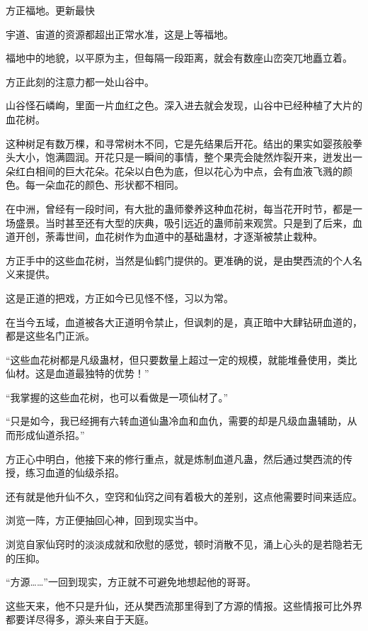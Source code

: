 
\begin{this_body}



方正福地。更新最快

宇道、宙道的资源都超出正常水准，这是上等福地。

福地中的地貌，以平原为主，但每隔一段距离，就会有数座山峦突兀地矗立着。

方正此刻的注意力都一处山谷中。

山谷怪石嶙峋，里面一片血红之色。深入进去就会发现，山谷中已经种植了大片的血花树。

这种树足有数万棵，和寻常树木不同，它是先结果后开花。结出的果实如婴孩般拳头大小，饱满圆润。开花只是一瞬间的事情，整个果壳会陡然炸裂开来，迸发出一朵红白相间的巨大花朵。花朵以白色为底，但以花心为中点，会有血液飞溅的颜色。每一朵血花的颜色、形状都不相同。

在中洲，曾经有一段时间，有大批的蛊师豢养这种血花树，每当花开时节，都是一场盛景。当时甚至还有大型的庆典，吸引远近的蛊师前来观赏。只是到了后来，血道开创，荼毒世间，血花树作为血道中的基础蛊材，才逐渐被禁止栽种。

方正手中的这些血花树，当然是仙鹤门提供的。更准确的说，是由樊西流的个人名义来提供。

这是正道的把戏，方正如今已见怪不怪，习以为常。

在当今五域，血道被各大正道明令禁止，但讽刺的是，真正暗中大肆钻研血道的，都是这些名门正派。

“这些血花树都是凡级蛊材，但只要数量上超过一定的规模，就能堆叠使用，类比仙材。这是血道最独特的优势！”

“我掌握的这些血花树，也可以看做是一项仙材了。”

“只是如今，我已经拥有六转血道仙蛊冷血和血仇，需要的却是凡级血蛊辅助，从而形成仙道杀招。”

方正心中明白，他接下来的修行重点，就是炼制血道凡蛊，然后通过樊西流的传授，练习血道的仙级杀招。

还有就是他升仙不久，空窍和仙窍之间有着极大的差别，这点他需要时间来适应。

浏览一阵，方正便抽回心神，回到现实当中。

浏览自家仙窍时的淡淡成就和欣慰的感觉，顿时消散不见，涌上心头的是若隐若无的压抑。

“方源……”一回到现实，方正就不可避免地想起他的哥哥。

这些天来，他不只是升仙，还从樊西流那里得到了方源的情报。这些情报可比外界都要详尽得多，源头来自于天庭。


\end{this_body}
